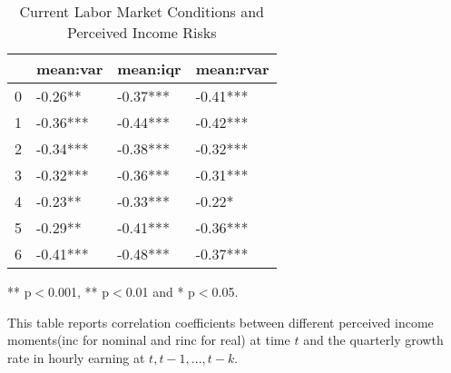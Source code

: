 
\begin{table}[ht]
\centering
\begin{adjustbox}{width={\textwidth}}
\begin{threeparttable}
\caption{Current Labor Market Conditions and Perceived Income Risks}
\label{macro_corr_he}
\begin{tabular}{llll}
\toprule
{} &  mean:var &  mean:iqr & mean:rvar \\
\midrule
0 &   -0.26** &  -0.37*** &  -0.41*** \\
1 &  -0.36*** &  -0.44*** &  -0.42*** \\
2 &  -0.34*** &  -0.38*** &  -0.32*** \\
3 &  -0.32*** &  -0.36*** &  -0.31*** \\
4 &   -0.23** &  -0.33*** &    -0.22* \\
5 &   -0.29** &  -0.41*** &  -0.36*** \\
6 &  -0.41*** &  -0.48*** &  -0.37*** \\
\bottomrule
\end{tabular}
\begin{tablenotes}
\item *** p$<$0.001, ** p$<$0.01 and * p$<$0.05.
\item This table reports correlation coefficients between different perceived income moments(inc for nominal
and rinc for real) at time
$t$ and the quarterly growth rate in hourly earning at $t,t-1,...,t-k$.
\end{tablenotes}
\end{threeparttable}
\end{adjustbox}
\end{table}